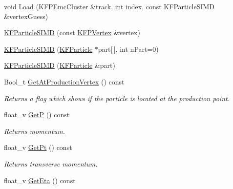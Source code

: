 \begin{DoxyCompactItemize}
\item 
void \hyperlink{classKFParticleSIMD_a38255ec3ea343230bc8aa39ebb75a2c6}{Load} (\hyperlink{classKFPEmcCluster}{K\+F\+P\+Emc\+Cluster} \&track, int index, const \hyperlink{classKFParticleSIMD}{K\+F\+Particle\+S\+I\+MD} \&vertex\+Guess)
\item 
\hyperlink{classKFParticleSIMD_aba76dc8326ba159c2e961f9081c7a919}{K\+F\+Particle\+S\+I\+MD} (const \hyperlink{classKFPVertex}{K\+F\+P\+Vertex} \&vertex)
\item 
\hyperlink{classKFParticleSIMD_a43c89c4fa15ede32dc6bdece1b5481cd}{K\+F\+Particle\+S\+I\+MD} (\hyperlink{classKFParticle}{K\+F\+Particle} $\ast$part\mbox{[}$\,$\mbox{]}, int n\+Part=0)
\item 
\hyperlink{classKFParticleSIMD_ac620514cea0df594ee3f0886455b4980}{K\+F\+Particle\+S\+I\+MD} (\hyperlink{classKFParticle}{K\+F\+Particle} \&part)
\item 
Bool\+\_\+t \hyperlink{classKFParticleSIMD_a6b280814d03355ede5f54fd333f65b00}{Get\+At\+Production\+Vertex} () const \hypertarget{classKFParticleSIMD_a6b280814d03355ede5f54fd333f65b00}{}\label{classKFParticleSIMD_a6b280814d03355ede5f54fd333f65b00}

\begin{DoxyCompactList}\small\item\em Returns a flag which shows if the particle is located at the production point. \end{DoxyCompactList}\item 
float\+\_\+v \hyperlink{classKFParticleSIMD_a73e5b4c10ec8ec0f2254da8d7a151e9d}{GetP} () const \hypertarget{classKFParticleSIMD_a73e5b4c10ec8ec0f2254da8d7a151e9d}{}\label{classKFParticleSIMD_a73e5b4c10ec8ec0f2254da8d7a151e9d}

\begin{DoxyCompactList}\small\item\em Returns momentum. \end{DoxyCompactList}\item 
float\+\_\+v \hyperlink{classKFParticleSIMD_afa4110f0c19aeb0e6416a2ff851c121a}{Get\+Pt} () const \hypertarget{classKFParticleSIMD_afa4110f0c19aeb0e6416a2ff851c121a}{}\label{classKFParticleSIMD_afa4110f0c19aeb0e6416a2ff851c121a}

\begin{DoxyCompactList}\small\item\em Returns transverse momentum. \end{DoxyCompactList}\item 
float\+\_\+v \hyperlink{classKFParticleSIMD_a0a034fe797629742f498a57645b2bdd2}{Get\+Eta} () const \hypertarget{classKFParticleSIMD_a0a034fe797629742f498a57645b2bdd2}{}\label{classKFParticleSIMD_a0a034fe797629742f498a57645b2bdd2}


\end{DoxyCompactItemize}
